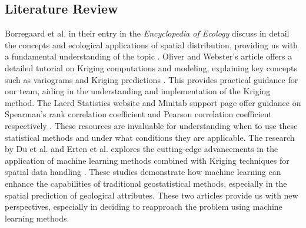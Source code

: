 \documentclass{swmcmthesis}
\begin{document}
\subsection{Literature Review}
Borregaard et al. in their entry in the \textit{Encyclopedia of Ecology} discuss in detail the concepts and ecological applications of spatial distribution, providing us with a fundamental understanding of the topic \cite{bib6}. Oliver and Webster's article offers a detailed tutorial on Kriging computations and modeling, explaining key concepts such as variograms and Kriging predictions \cite{bib5}. This provides practical guidance for our team, aiding in the understanding and implementation of the Kriging method. The Laerd Statistics website and Minitab support page offer guidance on Spearman's rank correlation coefficient and Pearson correlation coefficient respectively \cite{bib2, bib3}. These resources are invaluable for understanding when to use these statistical methods and under what conditions they are applicable. The research by Du et al. and Erten et al. explores the cutting-edge advancements in the application of machine learning methods combined with Kriging techniques for spatial data handling \cite{bib8, bib9}. These studies demonstrate how machine learning can enhance the capabilities of traditional geostatistical methods, especially in the spatial prediction of geological attributes. These two articles provide us with new perspectives, especially in deciding to reapproach the problem using machine learning methods.
\end{document}
